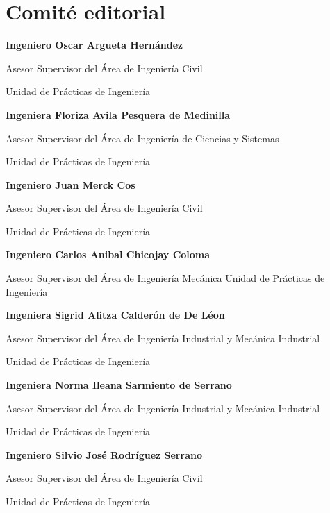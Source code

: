 \documentclass[12pt,spanish,Letterpaper,openany]{book}
\newcommand{\spacethreemilis}{\vspace{3mm}}
\begin{document}
\hypertarget{comiteeditorial}{%
\chapter*{Comité editorial}\label{comiteeditorial}}

\spacethreemilis
\spacethreemilis

\textbf{Ingeniero Oscar Argueta Hernández}

Asesor Supervisor del Área de Ingeniería Civil

Unidad de Prácticas de Ingeniería

\spacethreemilis

\textbf{Ingeniera Floriza Avila Pesquera de Medinilla}

Asesor Supervisor del Área de Ingeniería de Ciencias y Sistemas

Unidad de Prácticas de Ingeniería

\spacethreemilis

\textbf{Ingeniero Juan Merck Cos}

Asesor Supervisor del Área de Ingeniería Civil

Unidad de Prácticas de Ingeniería

\spacethreemilis

\textbf{Ingeniero Carlos Anibal Chicojay Coloma}

Asesor Supervisor del Área de Ingeniería Mecánica Unidad de Prácticas de Ingeniería

\spacethreemilis

\textbf{Ingeniera Sigrid Alitza Calderón de De Léon}

Asesor Supervisor del Área de Ingeniería Industrial y Mecánica Industrial

Unidad de Prácticas de Ingeniería

\spacethreemilis

\textbf{Ingeniera Norma Ileana Sarmiento de Serrano}

Asesor Supervisor del Área de Ingeniería Industrial y Mecánica Industrial

Unidad de Prácticas de Ingeniería

\spacethreemilis

\textbf{Ingeniero Silvio José Rodríguez Serrano}

Asesor Supervisor del Área de Ingeniería Civil

Unidad de Prácticas de Ingeniería

\spacethreemilis
\end{document}
